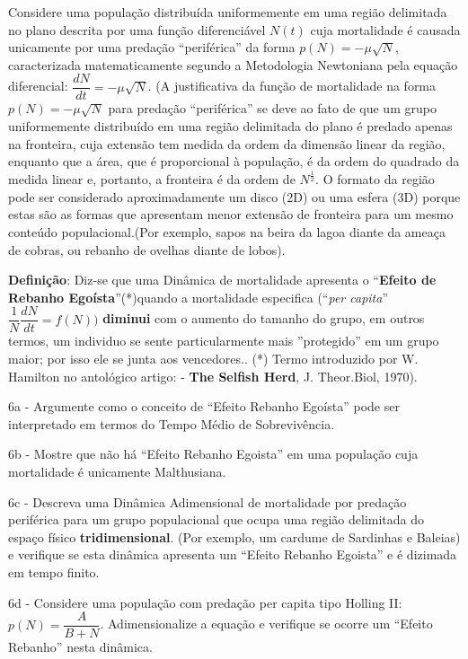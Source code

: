     Considere uma população distribuída uniformemente em uma região delimitada no plano descrita por uma função diferenciável \(N(t)\) cuja mortalidade é causada unicamente por uma predação ``periférica'' da forma \(p(N) = -\mu \sqrt{N}\), caracterizada matematicamente segundo a Metodologia Newtoniana pela equação diferencial: \(\dfrac{dN}{dt} = - \mu \sqrt{N}\). (A justificativa da função de mortalidade na forma \(p(N) = -\mu \sqrt{N}\) para predação ``periférica'' se deve ao fato de que um grupo uniformemente distribuído em uma região delimitada do plano é predado apenas na fronteira, cuja extensão tem medida da ordem da dimensão linear da região, enquanto que a área, que é proporcional à população, é da ordem do quadrado da medida linear e, portanto, a fronteira é da ordem de \(N^{\frac{1}{2}}\). O formato da região pode ser considerado aproximadamente um disco (2D) ou uma esfera (3D) porque estas são as formas que apresentam menor extensão de fronteira para um mesmo conteúdo populacional.(Por exemplo, sapos na beira da lagoa diante da ameaça de cobras, ou rebanho de ovelhas diante de lobos).

    \textbf{Definição}: Diz-se que uma Dinâmica de mortalidade apresenta o ``\textbf{Efeito de Rebanho Egoísta}''(*)quando a mortalidade especifica (``\textit{per capita}'' \(\dfrac{1}{N} \dfrac{dN}{dt} = f(N))\) \textbf{diminui} com o aumento do tamanho do grupo, em outros termos, um individuo se sente particularmente mais ''protegido'' em um grupo maior; por isso ele se junta aos vencedores.. (*) Termo introduzido por W. Hamilton no antológico artigo: - \textbf{The Selfish Herd}, J. Theor.Biol, 1970).

    6a - Argumente como o conceito de ``Efeito Rebanho Egoísta'' pode ser interpretado em termos do Tempo Médio de Sobrevivência.

    6b - Mostre que não há ``Efeito Rebanho Egoista'' em uma população cuja mortalidade é unicamente Malthusiana.

    6c - Descreva uma Dinâmica Adimensional de mortalidade por predação periférica para um grupo populacional que ocupa uma região delimitada do espaço físico \textbf{tridimensional}. (Por exemplo, um cardume de Sardinhas e Baleias) e verifique se esta dinâmica apresenta um ``Efeito Rebanho Egoista'' e é dizimada em tempo finito.

    6d - Considere uma população com predação per capita tipo Holling II: \(p(N) = \dfrac{A}{B+N}\). Adimensionalize a equação e verifique se ocorre um ``Efeito Rebanho'' nesta dinâmica.

